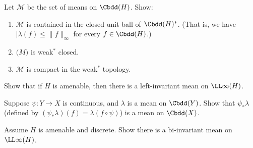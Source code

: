 \begin{exercises}
\item \label{MeansCpct}
Let $\mathcal{M}$ be the set of means on $\Cbdd(H)$. Show:
	\begin{enumerate}
	\item $\mathcal{M}$ is contained in the closed unit ball of $\Cbdd(H)^*$. (That is, we have $|\lambda(f) \le \|f\|_\infty$ for every $f \in \Cbdd(H)$.)
	\item $\mathcal(M)$ is weak$^*$ closed.
	\item $\mathcal{M}$ is compact in the weak$^*$ topology.
	\end{enumerate}

\label{MeanLinfty}
Show that if $H$ is amenable, then there is a left-invariant mean on $\LL\infty(H)$.

\item \label{MapMeans}
Suppose $\psi \colon Y \to X$ is continuous, and $\lambda$ is a mean on $\Cbdd(Y)$. Show that $\psi_*\lambda$ (defined by $(\psi_*\lambda)(f) = \lambda ( f \circ \psi )$) is a mean on $\Cbdd(X)$.


\item \label{DiscreteBiInv}
Assume $H$ is amenable and discrete. Show there is a bi-invariant mean on $\LL\infty(H)$.


\end{exercises}
